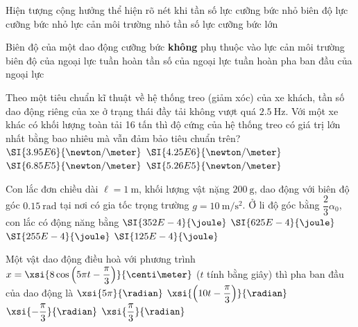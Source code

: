 \begin{ex}
	Hiện tượng cộng hưởng thể hiện rõ nét khi
	\choice
	{tần số lực cưỡng bức nhỏ}
	{biên độ lực cưỡng bức nhỏ}
	{\True lực cản môi trường nhỏ}
	{tần số lực cưỡng bức lớn}
	\loigiai{}
\end{ex}
\begin{ex}
	Biên độ của một dao động cưỡng bức \textbf{không} phụ thuộc vào
	\choice
	{lực cản môi trường}
	{biên độ của ngoại lực tuần hoàn}
	{tần số của ngoại lực tuần hoàn}
	{\True pha ban đầu của ngoại lực}
\end{ex}
\begin{ex}
Theo một tiêu chuẩn kĩ thuật về hệ thống treo (giảm xóc) của xe khách, tần số dao động riêng của xe ở trạng thái đầy tải không vượt quá $\SI{2.5}{\hertz}$. Với một xe khác có khối lượng toàn tải 16 tấn thì độ cứng của hệ thống treo có giá trị lớn nhất bằng bao nhiêu mà vẫn đảm bảo tiêu chuẩn trên?	
	\choice
	{\True $\SI{3.95E6}{\newton/\meter}$}
	{$\SI{4.25E6}{\newton/\meter}$}
	{$\SI{6.85E5}{\newton/\meter}$}
	{$\SI{5.26E5}{\newton/\meter}$}
\end{ex}
\begin{ex}
	Con lắc đơn chiều dài $\ell=\SI{1}{\meter}$, khối lượng vật nặng $\SI{200}{\gram}$, dao động với biên độ góc $\SI{0.15}{\radian}$ tại nơi có gia tốc trọng trường $g=\SI{10}{\meter/\second^2}$. Ở li độ góc bằng $\dfrac{2}{3}\alpha_0$, con lắc có động năng bằng
	\choice
	{$\SI{352E-4}{\joule}$}
	{$\SI{625E-4}{\joule}$}
	{$\SI{255E-4}{\joule}$}
	{\True $\SI{125E-4}{\joule}$}
\end{ex}
\begin{ex}
Một vật dao động điều hoà với phương trình $x=\xsi{8\cos\left(5\pi t-\dfrac{\pi}{3}\right)}{\centi\meter}$ ($t$ tính bằng giây) thì pha ban đầu của dao động là	
	\choice
	{$\xsi{5\pi}{\radian}$}
	{$\xsi{\left(10t-\dfrac{\pi}{3}\right)}{\radian}$}
	{\True $\xsi{-\dfrac{\pi}{3}}{\radian}$}
	{$\xsi{\dfrac{\pi}{3}}{\radian}$}
	\loigiai{}
\end{ex}
